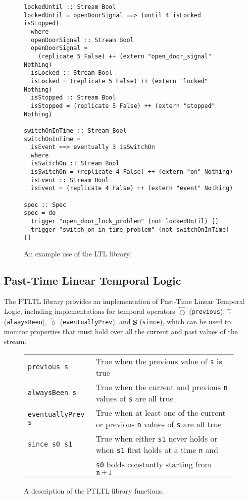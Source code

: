 \begin{figure*}[!htb]
\begin{lstlisting}[frame=none]
lockedUntil :: Stream Bool
lockedUntil = openDoorSignal ==> (until 4 isLocked isStopped)
  where
  openDoorSignal :: Stream Bool
  openDoorSignal =
    (replicate 5 False) ++ (extern "open_door_signal" Nothing)
  isLocked :: Stream Bool
  isLocked = (replicate 5 False) ++ (extern "locked" Nothing)
  isStopped :: Stream Bool
  isStopped = (replicate 5 False) ++ (extern "stopped" Nothing)

switchOnInTime :: Stream Bool
switchOnInTime =
  isEvent ==> eventually 3 isSwitchOn
  where
  isSwitchOn :: Stream Bool
  isSwitchOn = (replicate 4 False) ++ (extern "on" Nothing)
  isEvent :: Stream Bool
  isEvent = (replicate 4 False) ++ (extern "event" Nothing)

spec :: Spec
spec = do
  trigger "open_door_lock_problem" (not lockedUntil) []
  trigger "switch_on_in_time_problem" (not switchOnInTime) []
\end{lstlisting}
\caption{An example use of the LTL library.}
\label{fig:ltl_example}
\end{figure*}

\subsection{Past-Time Linear Temporal Logic}
The PTLTL library provides an implementation of Past-Time Linear Temporal Logic,
including implementations for temporal operators
$\overset{\leftarrow}{\bigcirc}$ (\verb,previous,), $\overset{\leftarrow}{\square}$
(\verb,alwaysBeen,), $\overset{\leftarrow}{\lozenge}$ (\verb,eventuallyPrev,),
and $\mathbf{S}$ (\verb,since,), which can be used to monitor
properties that must hold over all the current and past values of the stream.

\begin{figure*}[!htb]
\begin{tabular}{l l}
\verb,previous s, & True when the previous value of \verb,s, is true\\
\verb,alwaysBeen s, & True when the current and previous \verb,n,
                        values of \verb,s, are all true\\
\verb,eventuallyPrev s, & True when at least one of the current or
                            previous \verb,n, values of \verb,s, are all true\\
\verb,since s0 s1, & True when either \verb,s1, never holds or when
                     \verb,s1, first holds at a time \verb,n, and\\
                   & \verb,s0, holds constantly starting from
                     $\verb,n, + 1$
\end{tabular}
\caption{A description of the PTLTL library functions.}
\label{fig:ptltl_desc}
\end{figure*}

